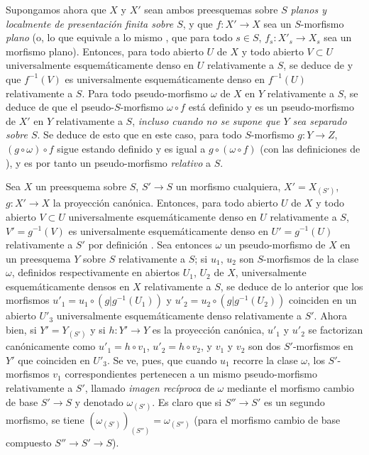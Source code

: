 \begin{env}[20.5.7]
\label{IV.20.5.7}
Supongamos ahora que $X$ y $X'$ sean ambos preesquemas sobre $S$ \emph{planos y localmente de presentación finita sobre $S$}, y que $f:X'\to X$ sea un $S$-morfismo \emph{plano} (o, lo que equivale a lo mismo , que para todo $s\in S$, $f_s:X'_s\to X_s$ sea un morfismo plano).
Entonces, para todo abierto $U$ de $X$ y todo abierto $V\subset U$ universalmente esquemáticamente denso en $U$ relativamente a $S$, se deduce de  y  que $f^{-1}(V)$ es universalmente esquemáticamente denso en $f^{-1}(U)$ relativamente a $S$.
Para todo pseudo-morfismo $\omega$ de $X$ en $Y$ relativamente a $S$, se deduce de  que el pseudo-$S$-morfismo $\omega\circ f$ está definido y es un pseudo-morfismo de $X'$ en $Y$ relativamente a $S$, \emph{incluso cuando no se supone que $Y$ sea separado sobre $S$}.
Se deduce de esto que en este caso, para todo $S$-morfismo $g:Y\to Z$, $(g\circ\omega)\circ f$ sigue estando definido y es igual a $g\circ(\omega\circ f)$ (con las definiciones de ), y es por tanto un pseudo-morfismo \emph{relativo} a $S$.
\end{env}

\begin{env}[20.5.8]
\label{IV.20.5.8}
Sea $X$ un preesquema sobre $S$, $S'\to S$ un morfismo cualquiera, $X'=X_{(S')}$, $g:X'\to X$ la proyección canónica.
Entonces, para todo abierto $U$ de $X$ y todo abierto $V\subset U$ universalmente esquemáticamente denso en $U$ relativamente a $S$, $V'=g^{-1}(V)$ es universalmente esquemáticamente denso en $U'=g^{-1}(U)$ relativamente a $S'$ por definición .
Sea entonces $\omega$ un pseudo-morfismo de $X$ en un preesquema $Y$ sobre $S$ relativamente a $S$; si $u_1$, $u_2$ son $S$-morfismos de la clase $\omega$, definidos respectivamente en abiertos $U_1$, $U_2$ de $X$, universalmente esquemáticamente densos en $X$ relativamente a $S$, se deduce de lo anterior que los morfismos $u'_1=u_1\circ(g|g^{-1}(U_1))$ y $u'_2=u_2\circ(g|g^{-1}(U_2))$ coinciden en un abierto $U'_3$ universalmente esquemáticamente denso relativamente a $S'$.
Ahora bien, si $Y'=Y_{(S')}$ y si $h:Y'\to Y$ es la proyección canónica, $u'_1$ y $u'_2$ se factorizan canónicamente como $u'_1=h\circ v_1$, $u'_2=h\circ v_2$, y $v_1$ y $v_2$ son dos $S'$-morfismos en $Y'$ que coinciden en $U'_3$.
Se ve, pues, que cuando $u_1$ recorre la clase $\omega$, los $S'$-morfismos $v_1$ correspondientes pertenecen a un mismo pseudo-morfismo relativamente a $S'$, llamado \emph{imagen recíproca} de $\omega$ mediante el morfismo cambio de base $S'\to S$ y denotado $\omega_{(S')}$.
Es claro que si $S''\to S'$ es un segundo morfismo, se tiene $(\omega_{(S')})_{(S'')}=\omega_{(S'')}$ (para el morfismo cambio de base compuesto $S''\to S'\to S$).
\end{env}

